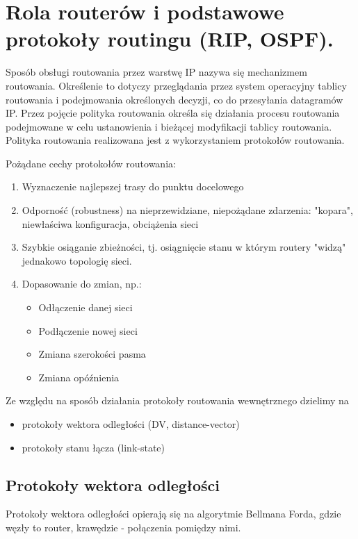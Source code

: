 \documentclass[main.tex]{subfiles}
\begin{document}
    \newpage

    \section{Rola routerów i podstawowe protokoły routingu (RIP, OSPF).}

    Sposób obsługi routowania przez warstwę IP nazywa się mechanizmem routowania.
    Określenie to dotyczy przeglądania przez system operacyjny tablicy routowania i podejmowania określonych decyzji, co do przesyłania datagramów IP.
    Przez pojęcie polityka routowania określa się działania procesu routowania podejmowane w
    celu ustanowienia i bieżącej modyfikacji tablicy routowania. Polityka routowania realizowana jest z wykorzystaniem protokołów routowania.

    Pożądane cechy protokołów routowania:
    \begin{enumerate}
        \item Wyznaczenie najlepszej trasy do punktu docelowego
        \item Odporność (robustness) na nieprzewidziane, niepożądane zdarzenia:
        "kopara", niewłaściwa konfiguracja, obciążenia sieci
        \item Szybkie osiąganie zbieżności, tj. osiągnięcie stanu w którym
        routery "widzą" jednakowo topologię sieci.
        \item Dopasowanie do zmian, np.:
        \begin{itemize}
            \item Odłączenie danej sieci
            \item Podłączenie nowej sieci
            \item Zmiana szerokości pasma
            \item Zmiana opóźnienia
        \end{itemize}
    \end{enumerate}

    Ze względu na sposób działania protokoły routowania wewnętrznego dzielimy na
    \begin{itemize}
        \item protokoły wektora odległości (DV, distance-vector)
        \item protokoły stanu łącza (link-state)
    \end{itemize}

    \newpage

    \subsection{Protokoły wektora odległości}
    Protokoły wektora odległości opierają się na algorytmie Bellmana Forda, gdzie
    węzły to router, krawędzie - połączenia pomiędzy nimi.
\end{document}
